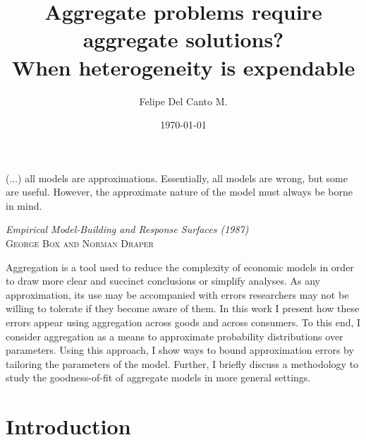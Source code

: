\documentclass[english, a4paper, 12pt]{article}
\author{Felipe Del Canto M.}
\title{Aggregate problems require aggregate solutions? \\ When heterogeneity is expendable}
\date{\today}
\begin{document}
\maketitle
\thispagestyle{empty}


\vfill
\epigraph{(...) all models are approximations. Essentially, all models are wrong, but some are useful. However, %
the approximate nature of the model must always be borne in mind.}{\textit{Empirical Model-Building and Response Surfaces (1987)} \\ \textsc{George Box and Norman Draper}}

\vfill
{\abstract Aggregation is a tool used to reduce the complexity of economic models in order to draw more clear and succinct conclusions or simplify analyses. As any approximation, its use may be accompanied with errors researchers may not be willing to tolerate if they become aware of them. In this work I present how these errors appear using aggregation across goods and across consumers. To this end, I consider aggregation as a means to approximate probability distributions over parameters. Using this approach, I show ways to bound approximation errors by tailoring the parameters of the model. Further, I briefly discuss a methodology to study the goodness-of-fit of aggregate models in more general settings.}
\vfill


\newpage
\section{Introduction}
\end{document}
